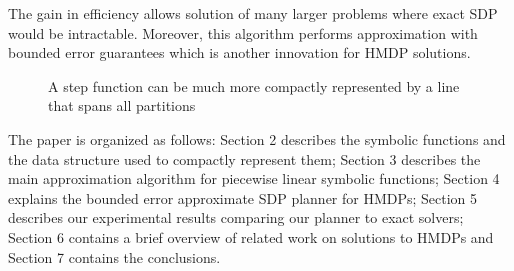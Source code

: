The gain in efficiency allows solution of many larger problems where exact SDP would be intractable. Moreover, this algorithm performs approximation with bounded error guarantees which is another innovation for HMDP solutions.

\begin{figure}[!ht]
\centering
{}
{}
\caption{A step function can be much more compactly represented by a line that spans all partitions}
 \label{stepfunfig}
\end{figure}

The paper is organized as follows: Section 2 describes the symbolic functions and the data structure used to compactly represent them; Section 3 describes the main approximation algorithm for piecewise linear symbolic functions; Section 4 explains the bounded error approximate SDP planner for HMDPs; Section 5 describes our experimental results comparing our planner to exact solvers; Section 6 contains a brief overview of related work on solutions to HMDPs and Section 7 contains the conclusions.
